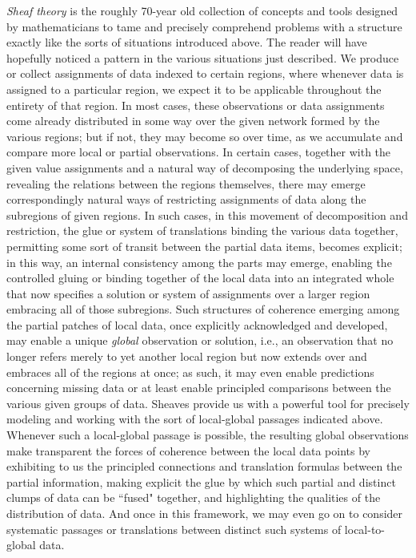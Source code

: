 \documentclass[a4paper]{book}
\theoremstyle{definition}
\theoremstyle{definition}
\theoremstyle{definition}
\theoremstyle{theorem}
\theoremstyle{definition}
\begin{document}
	\textit{Sheaf theory} is the roughly 70-year old collection of concepts and tools designed by mathematicians to tame and precisely comprehend problems with a structure exactly like the sorts of situations introduced above. The reader will have hopefully noticed a pattern in the various situations just described. We produce or collect assignments of data indexed to certain regions, where whenever data is assigned to a particular region, we expect it to be applicable throughout the entirety of that region. In most cases, these observations or data assignments come already distributed  in some way over the given network formed by the various regions; but if not, they may become so over time, as we accumulate and compare more local or partial observations. In certain cases, together with the given value assignments and a natural way of decomposing the underlying space, revealing the relations between the regions themselves, there may emerge correspondingly natural ways of restricting assignments of data along the subregions of given regions. In such cases, in this movement of decomposition and restriction, the glue or system of translations binding the various data together, permitting some sort of transit between the partial data items, becomes explicit; in this way, an internal consistency among the parts may emerge, enabling the controlled gluing or binding together of the local data into an integrated whole that now specifies a solution or system of assignments over a larger region embracing all of those subregions. Such structures of coherence emerging among the partial patches of local data, once explicitly acknowledged and developed, may enable a unique \textit{global} observation or solution, i.e., an observation that no longer refers merely to yet another local region but now extends over and embraces all of the regions at once; as such, it may even enable predictions concerning missing data or at least enable principled comparisons between the various given groups of data. Sheaves provide us with a powerful tool for precisely modeling and working with the sort of local-global passages indicated above. Whenever such a local-global passage is possible, the resulting global observations make transparent the forces of coherence between the local data points by exhibiting to us the principled connections and translation formulas between the partial information, making explicit the glue by which such partial and distinct clumps of data can be ``fused" together, and highlighting the qualities of the distribution of data. And once in this framework, we may even go on to consider systematic passages or translations between distinct such systems of local-to-global data. \par 
\end{document}
